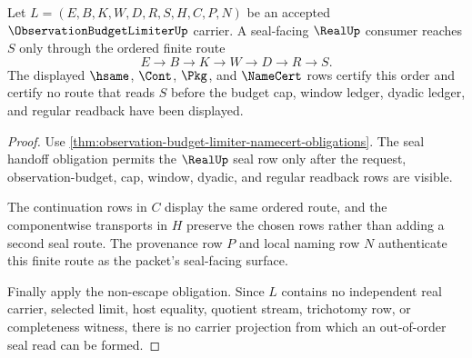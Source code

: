 \begin{theorem}
\label{thm:observation-budget-limiter-seal-ordering}
Let $L=(E,B,K,W,D,R,S,H,C,P,N)$ be an accepted $\ObservationBudgetLimiterUp$ carrier. A seal-facing $\RealUp$ consumer reaches $S$ only through the ordered finite route
$$
E \to B \to K \to W \to D \to R \to S.
$$
The displayed $\hsame$, $\Cont$, $\Pkg$, and $\NameCert$ rows certify this order and certify no route that reads $S$ before the budget cap, window ledger, dyadic ledger, and regular readback have been displayed.
\end{theorem}
\begin{proof}
Use \autoref{thm:observation-budget-limiter-namecert-obligations}. The seal handoff obligation permits the $\RealUp$ seal row only after the request, observation-budget, cap, window, dyadic, and regular readback rows are visible.

The continuation rows in $C$ display the same ordered route, and the componentwise transports in $H$ preserve the chosen rows rather than adding a second seal route. The provenance row $P$ and local naming row $N$ authenticate this finite route as the packet's seal-facing surface.

Finally apply the non-escape obligation. Since $L$ contains no independent real carrier, selected limit, host equality, quotient stream, trichotomy row, or completeness witness, there is no carrier projection from which an out-of-order seal read can be formed.
\end{proof}

